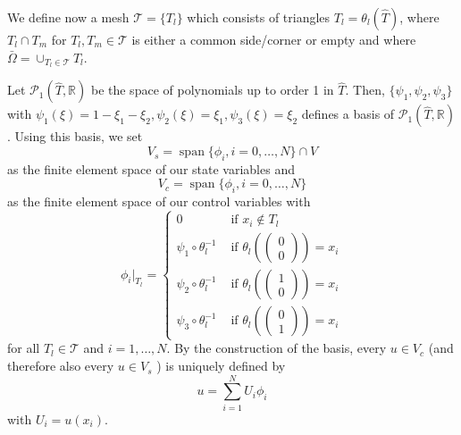 We define now a mesh $\mathcal{T}=\{T_l\}$ which consists of triangles $T_l=\theta_l(\hat{T})$, where $T_l\cap T_m$ for $T_l,T_m\in\mathcal{T}$ is either a common side/corner or empty and where $\bar{\Omega}=\cup_{T_l\in\mathcal{T}}T_l$.

Let $\mathcal{P}_1(\hat{T}, \mathbb{R})$ be the space of polynomials up to order 1 in $\hat{T}$. Then, $\{\psi_1, \psi_2, \psi_3\}$ with $\psi_1(\xi)=1-\xi_1-\xi_2, \psi_2(\xi)=\xi_1, \psi_3(\xi)=\xi_2$ defines a basis of $\mathcal{P}_1(\hat{T}, \mathbb{R})$.
Using this basis, we set
\begin{displaymath}
V_s=\operatorname*{span}\{\phi_i, i=0,\dotsc,N\}\cap V
\end{displaymath}
as the finite element space of our state variables and
\begin{displaymath}
V_c=\operatorname*{span}\{\phi_i, i=0,\dotsc,N\}
\end{displaymath}
as the finite element space of our control variables with
\begin{displaymath}
\phi_i|_{T_l}=\begin{cases}
0 & \text{ if $x_i\notin T_l$}\\
\psi_1 \circ \theta_l^{-1} & \text{ if $\theta_l\left(\begin{pmatrix} 0 \\ 0 \end{pmatrix}\right)=x_i$}\\
\psi_2 \circ \theta_l^{-1} & \text{ if $\theta_l\left(\begin{pmatrix} 1 \\ 0 \end{pmatrix}\right)=x_i$}\\
\psi_3 \circ \theta_l^{-1} & \text{ if $\theta_l\left(\begin{pmatrix} 0 \\ 1 \end{pmatrix}\right)=x_i$}
\end{cases} 
\end{displaymath}
for all $T_l\in\mathcal{T}$ and $i=1,\dotsc,N$. By the construction of the basis, every $u\in V_c$ (and therefore also every $u\in V_s$ ) is uniquely defined by
\begin{displaymath}
u=\sum_{i=1}^NU_i\phi_i
\end{displaymath}
with $U_i=u(x_i)$.\\

